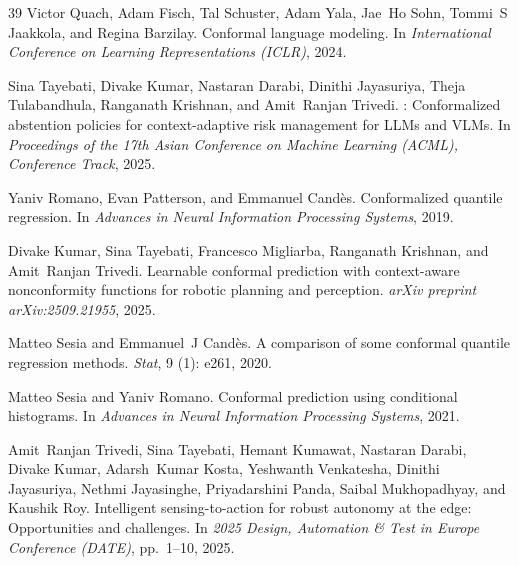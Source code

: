 \documentclass{article}
\begin{document}
\begin{thebibliography}{39}
Victor Quach, Adam Fisch, Tal Schuster, Adam Yala, Jae~Ho Sohn, Tommi~S Jaakkola, and Regina Barzilay.
\newblock Conformal language modeling.
\newblock In \emph{International Conference on Learning Representations (ICLR)}, 2024.

Sina Tayebati, Divake Kumar, Nastaran Darabi, Dinithi Jayasuriya, Theja Tulabandhula, Ranganath Krishnan, and Amit~Ranjan Trivedi.
: Conformalized abstention policies for context-adaptive risk management for {LLMs} and {VLMs}.
\newblock In \emph{Proceedings of the 17th Asian Conference on Machine Learning (ACML), Conference Track}, 2025{}.

Yaniv Romano, Evan Patterson, and Emmanuel Cand{\`e}s.
\newblock Conformalized quantile regression.
\newblock In \emph{Advances in Neural Information Processing Systems}, 2019.

Divake Kumar, Sina Tayebati, Francesco Migliarba, Ranganath Krishnan, and Amit~Ranjan Trivedi.
\newblock Learnable conformal prediction with context-aware nonconformity functions for robotic planning and perception.
\newblock \emph{arXiv preprint arXiv:2509.21955}, 2025{}.

Matteo Sesia and Emmanuel~J Cand{\`e}s.
\newblock A comparison of some conformal quantile regression methods.
\newblock \emph{Stat}, 9 (1): e261, 2020.

Matteo Sesia and Yaniv Romano.
\newblock Conformal prediction using conditional histograms.
\newblock In \emph{Advances in Neural Information Processing Systems}, 2021.

Amit~Ranjan Trivedi, Sina Tayebati, Hemant Kumawat, Nastaran Darabi, Divake Kumar, Adarsh~Kumar Kosta, Yeshwanth Venkatesha, Dinithi Jayasuriya, Nethmi Jayasinghe, Priyadarshini Panda, Saibal Mukhopadhyay, and Kaushik Roy.
\newblock Intelligent sensing-to-action for robust autonomy at the edge: Opportunities and challenges.
\newblock In \emph{2025 Design, Automation \& Test in Europe Conference (DATE)}, pp.\  1--10, 2025.


\end{thebibliography}
\end{document}
